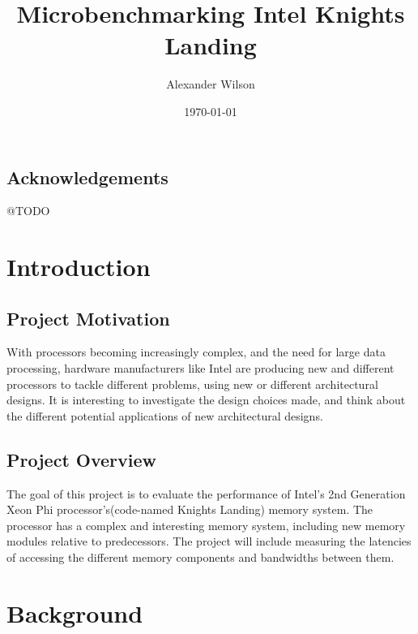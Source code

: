 \documentclass[bsc,frontabs,twoside,singlespacing,parskip,deptreport]{infthesis}     %
\begin{document}
\title{Microbenchmarking Intel Knights Landing}

\author{Alexander Wilson}
 


\date{\today} 


\maketitle



\section*{Acknowledgements}
@TODO 

\tableofcontents


\chapter{Introduction}
\section{Project Motivation}
With processors becoming increasingly complex, and the need for large data processing, hardware manufacturers like Intel are producing new and different processors to tackle different problems, using new or different architectural designs. It is interesting to investigate the design choices made, and think about the different potential applications of new architectural designs.


\section{Project Overview}
The goal of this project is to evaluate the performance of Intel's 2nd Generation Xeon Phi processor's(code-named Knights Landing) memory system. The processor has a complex and interesting memory system, including new memory modules relative to predecessors. The project will include measuring the latencies of accessing the different memory components and bandwidths between them.

\chapter{Background}
\end{document}
